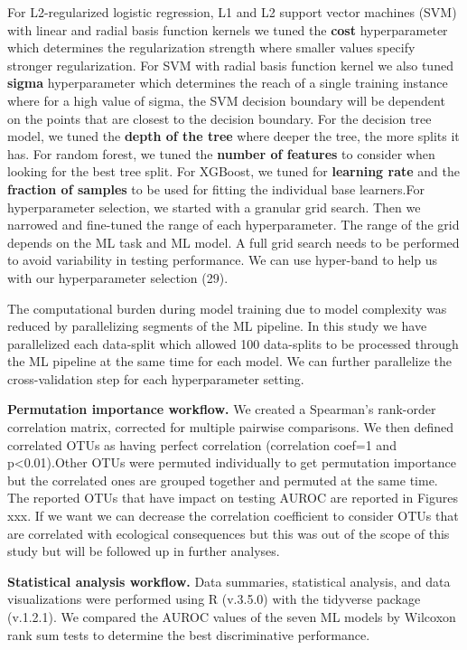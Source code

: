 \documentclass[11pt,]{article}
\begin{document}
For L2-regularized logistic regression, L1 and L2 support vector
machines (SVM) with linear and radial basis function kernels we tuned
the \textbf{cost} hyperparameter which determines the regularization
strength where smaller values specify stronger regularization. For SVM
with radial basis function kernel we also tuned \textbf{sigma}
hyperparameter which determines the reach of a single training instance
where for a high value of sigma, the SVM decision boundary will be
dependent on the points that are closest to the decision boundary. For
the decision tree model, we tuned the \textbf{depth of the tree} where
deeper the tree, the more splits it has. For random forest, we tuned the
\textbf{number of features} to consider when looking for the best tree
split. For XGBoost, we tuned for \textbf{learning rate} and the
\textbf{fraction of samples} to be used for fitting the individual base
learners.For hyperparameter selection, we started with a granular grid
search. Then we narrowed and fine-tuned the range of each
hyperparameter. The range of the grid depends on the ML task and ML
model. A full grid search needs to be performed to avoid variability in
testing performance. We can use hyper-band to help us with our
hyperparameter selection (29).

The computational burden during model training due to model complexity
was reduced by parallelizing segments of the ML pipeline. In this study
we have parallelized each data-split which allowed 100 data-splits to be
processed through the ML pipeline at the same time for each model. We
can further parallelize the cross-validation step for each
hyperparameter setting.

\textbf{Permutation importance workflow.} We created a Spearman's
rank-order correlation matrix, corrected for multiple pairwise
comparisons. We then defined correlated OTUs as having perfect
correlation (correlation coef=1 and p\textless{}0.01).Other OTUs were
permuted individually to get permutation importance but the correlated
ones are grouped together and permuted at the same time. The reported
OTUs that have impact on testing AUROC are reported in Figures xxx. If
we want we can decrease the correlation coefficient to consider OTUs
that are correlated with ecological consequences but this was out of the
scope of this study but will be followed up in further analyses.

\textbf{Statistical analysis workflow.} Data summaries, statistical
analysis, and data visualizations were performed using R (v.3.5.0) with
the tidyverse package (v.1.2.1). We compared the AUROC values of the
seven ML models by Wilcoxon rank sum tests to determine the best
discriminative performance.
\end{document}
